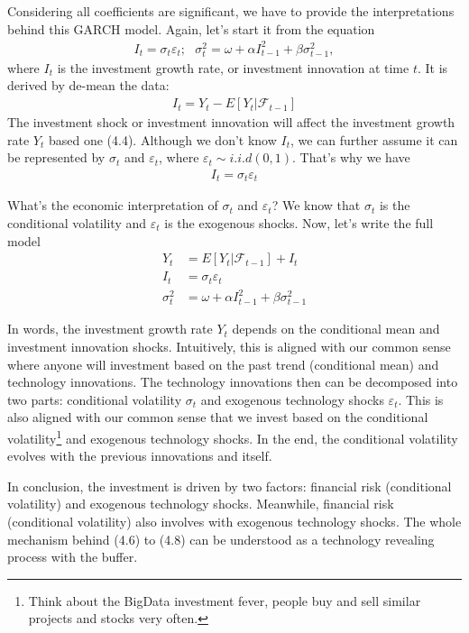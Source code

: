 \documentclass[12pt]{article}
\theoremstyle{definition}
\numberwithin{equation}{section}
\numberwithin{figure}{section}
\numberwithin{table}{section}
\begin{document}
Considering all coefficients are significant, we have to provide the interpretations behind this GARCH model. Again, let's start it from the equation
\begin{align}
  I_t = \sigma_t \varepsilon_t; \ \ \ \sigma_t^2 = \omega + \alpha I_{t-1}^2 + \beta \sigma_{t-1}^2,
\end{align}
where $I_t$ is the investment growth rate, or investment innovation at time $t$. It is derived by de-mean the data:
\begin{align}
  I_t = Y_t - E[Y_t | \mathcal{F}_{t-1}]
\end{align}
The investment shock or investment innovation will affect the investment growth rate $Y_t$ based one (4.4). Although we don’t know $I_t$, we can further assume it can be represented by $\sigma_t$ and $\varepsilon_t$, where $\varepsilon_t \sim i.i.d(0, 1)$. That's why we have
\begin{align}
  I_t = \sigma_t \varepsilon_t
\end{align}

What's the economic interpretation of $\sigma_t$ and $\varepsilon_t$? We know that $\sigma_t$ is the conditional volatility and $\varepsilon_t$ is the exogenous shocks. Now, let's write the full model
\begin{align}
  Y_t & = E[Y_t | \mathcal{F}_{t-1}] + I_t \\
  I_t & = \sigma_t \varepsilon_t \\
  \sigma_t^2 & = \omega + \alpha I_{t-1}^2 + \beta \sigma_{t-1}^2
\end{align}

In words, the investment growth rate $Y_t$ depends on the conditional mean and investment innovation shocks. Intuitively, this is aligned with our common sense where anyone will investment based on the past trend (conditional mean) and technology innovations. The technology innovations then can be decomposed into two parts: conditional volatility $\sigma_t$ and exogenous technology shocks $\varepsilon_t$. This is also aligned with our common sense that we invest based on the conditional volatility\footnote{Think about the BigData investment fever, people buy and sell similar projects and stocks very often.} and exogenous technology shocks. In the end, the conditional volatility evolves with the previous innovations and itself.

In conclusion, the investment is driven by two factors: financial risk (conditional volatility) and exogenous technology shocks. Meanwhile, financial risk (conditional volatility) also involves with exogenous technology shocks. The whole mechanism behind (4.6) to (4.8) can be understood as a technology revealing process with the buffer.
\end{document}
